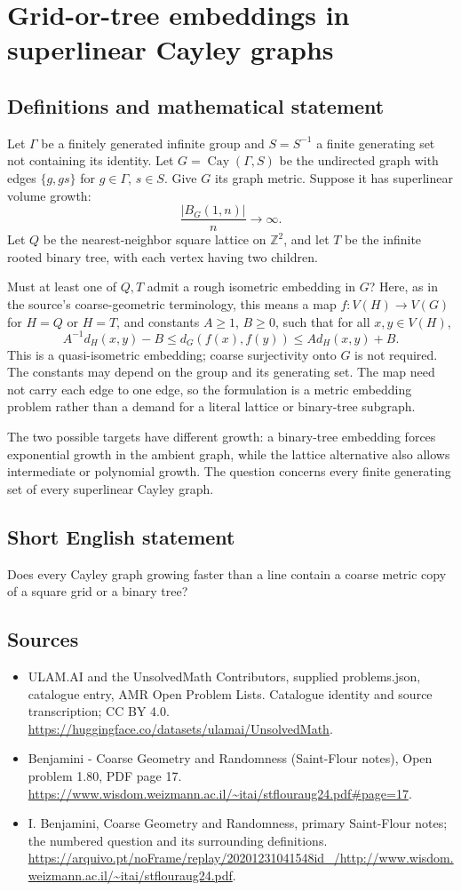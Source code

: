 \documentclass[11pt,a4paper]{article}
\begin{document}
\section*{Grid-or-tree embeddings in superlinear Cayley graphs}\label{statement}

\subsection{Definitions and mathematical statement}
Let $\Gamma$ be a finitely generated infinite group and $S=S^{-1}$ a finite generating set not containing its identity. Let $G=\operatorname{Cay}(\Gamma,S)$ be the undirected graph with edges $\{g,gs\}$ for $g\in\Gamma$, $s\in S$. Give $G$ its graph metric. Suppose it has superlinear volume growth:
\[
\frac{|B_G(1,n)|}{n}\longrightarrow\infty.
\]
Let $Q$ be the nearest-neighbor square lattice on $\mathbb Z^2$, and let $T$ be the infinite rooted binary tree, with each vertex having two children.

Must at least one of $Q,T$ admit a rough isometric embedding in $G$? Here, as in the source's coarse-geometric terminology, this means a map $f:V(H)\to V(G)$ for $H=Q$ or $H=T$, and constants $A\ge1$, $B\ge0$, such that for all $x,y\in V(H)$,
\[
A^{-1}d_H(x,y)-B\le d_G(f(x),f(y))\le A d_H(x,y)+B.
\]
This is a quasi-isometric embedding; coarse surjectivity onto $G$ is not required. The constants may depend on the group and its generating set. The map need not carry each edge to one edge, so the formulation is a metric embedding problem rather than a demand for a literal lattice or binary-tree subgraph.

The two possible targets have different growth: a binary-tree embedding forces exponential growth in the ambient graph, while the lattice alternative also allows intermediate or polynomial growth. The question concerns every finite generating set of every superlinear Cayley graph.
\subsection{Short English statement}
Does every Cayley graph growing faster than a line contain a coarse metric copy of a square grid or a binary tree?
\subsection{Sources}
\begin{itemize}
\item[S1] ULAM.AI and the UnsolvedMath Contributors, supplied problems.json, catalogue entry, AMR Open Problem Lists. Catalogue identity and source transcription; CC BY 4.0.
\url{https://huggingface.co/datasets/ulamai/UnsolvedMath}.
\item[S2] Benjamini - Coarse Geometry and Randomness (Saint-Flour notes), Open problem 1.80, PDF page 17. 
\url{https://www.wisdom.weizmann.ac.il/~itai/stflouraug24.pdf#page=17}.
\item[S3] I. Benjamini, Coarse Geometry and Randomness, primary Saint-Flour notes; the numbered question and its surrounding definitions.
\url{https://arquivo.pt/noFrame/replay/20201231041548id_/http://www.wisdom.weizmann.ac.il/~itai/stflouraug24.pdf}.
\end{itemize}
\end{document}
